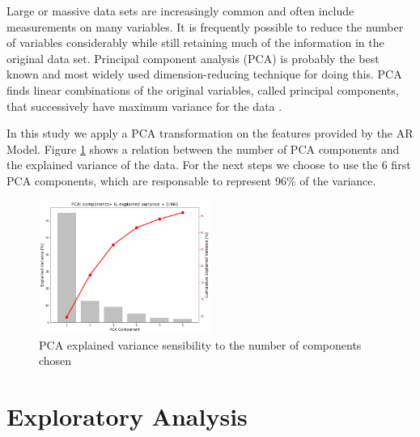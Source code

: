 \documentclass[twocolumn]{article}
\begin{document}
Large or massive data sets are increasingly common and often include measurements on many variables. It is frequently possible to reduce the number of variables considerably while still retaining much of the information in the original data set. Principal component analysis (PCA) is probably the best known and most widely used dimension-reducing technique for doing this. PCA finds linear combinations of the original variables, called principal components, that successively have maximum variance for the data \cite{pca}.

In this study we apply a PCA transformation on the features provided by the AR Model. Figure \ref{fig:pca0} shows a relation between the number of PCA components and the explained variance of the data. For the next steps we choose to use the 6 first PCA components, which are responsable to represent 96\% of the variance.

\begin{figure}[H]
      \centering
      \includegraphics[width=0.5\textwidth]{pca_0.png}
      \caption{PCA explained variance sensibility to the number of components chosen}
      \label{fig:pca0}
\end{figure}

%
%
\section{Exploratory Analysis}
\end{document}
